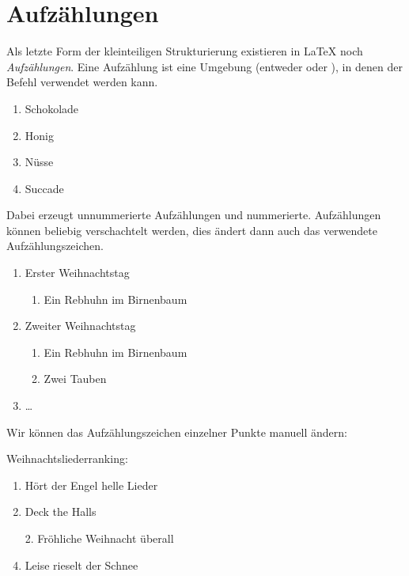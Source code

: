 \section{Aufzählungen}

Als letzte Form der kleinteiligen Strukturierung existieren in \LaTeX{} noch \emph{Aufzählungen}.
Eine Aufzählung ist eine Umgebung (entweder  oder ), in denen der Befehl  verwendet werden kann.
\begin{latexlisting}
	\begin{enumerate}
		\item Schokolade
		\item Honig
		\item Nüsse
		\item Succade
	\end{enumerate}
\end{latexlisting}
Dabei erzeugt  unnummerierte Aufzählungen und  nummerierte.
Aufzählungen können beliebig verschachtelt werden, dies ändert dann auch das verwendete Aufzählungszeichen.
\begin{latexlisting}
	\begin{enumerate}
		\item Erster Weihnachtstag
		\begin{enumerate}
			\item Ein Rebhuhn im Birnenbaum
		\end{enumerate}
		\item Zweiter Weihnachtstag
		\begin{enumerate}
			\item Ein Rebhuhn im Birnenbaum
			\item Zwei Tauben
		\end{enumerate}
		\item \dots
	\end{enumerate}
\end{latexlisting}
Wir können das Aufzählungszeichen einzelner Punkte manuell ändern:
\begin{latexlisting}
	Weihnachtsliederranking:
	\begin{enumerate}
		\item Hört der Engel helle Lieder
		\item Deck the Halls
		\item[2.] Fröhliche Weihnacht überall
		\item Leise rieselt der Schnee
	\end{enumerate}
\end{latexlisting}
